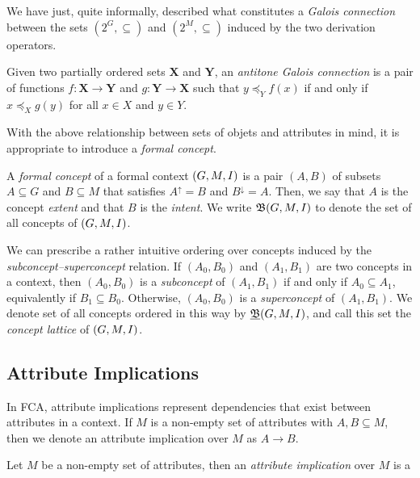 We have just, quite informally, described what constitutes a \textit{Galois connection} between the sets $(2^G, \subseteq)$ and $(2^M, \subseteq)$ induced by the two derivation operators. 

\begin{definition}
  \label{definition:galois-connection} 
  Given two partially ordered sets $\mathbf{X}$ and $\mathbf{Y}$, an \textit{antitone Galois connection} is a pair of functions $f:\mathbf{X}\!\to\!\mathbf{Y}$ and $g:\mathbf{Y}\!\to\!\mathbf{X}$ such that $y \preceq_Y f(x)$ if and only if $x \preceq_X g(y)$ for all $x\in X$ and $y\in Y$.
\end{definition}

With the above relationship between sets of objets and attributes in mind, it is appropriate to introduce a \textit{formal concept}. 

\begin{definition}
  \label{definition:formal-concept} 
  A \textit{formal concept} of a formal context $(G,M,\mathrel{I})$ is a pair $(A,B)$ of subsets $A \subseteq G$ and $B \subseteq M$ that satisfies $A^\uparrow = B$ and $B^\downarrow = A$. Then, we say that $A$ is the concept \textit{extent} and that $B$ is the \textit{intent}. We write $\mathfrak{B}(G,M,I)$ to denote the set of all concepts of $(G,M,I)$.
\end{definition}

We can prescribe a rather intuitive ordering over concepts induced by the \textit{subconcept–superconcept} relation. If $(A_0, B_0)$ and $(A_1, B_1)$ are two concepts in a context, then $(A_0, B_0)$ is a \textit{subconcept} of $(A_1, B_1)$ if and only if $A_0 \subseteq A_1$, equivalently if $B_1 \subseteq B_0$. Otherwise, $(A_0, B_0)$ is a \textit{superconcept} of $(A_1, B_1)$. We denote set of all concepts ordered in this way by $\underline{{\mathfrak B}} (G,M,\mathrel{I})$, and call this set the \textit{concept lattice} of $(G,M,\mathrel{I})$. 

\subsection{Attribute Implications}
\label{subsection:attribute-implications}

In FCA, attribute implications represent dependencies that exist between attributes in a context. If $M$ is a non-empty set of attributes with $A, B \subseteq M$, then we denote an attribute implication over $M$ as $A \rightarrow B$. 

\begin{definition}
     \label{definition:attribute-implication}
     Let $M$ be a non-empty set of attributes, then an \emph{attribute implication} over $M$ is a
\end{definition}




